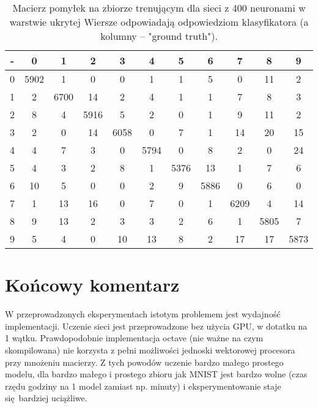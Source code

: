 \documentclass[a4paper]{article}
\begin{document}
\begin{table}[!hbt]
    \caption{Macierz pomyłek na zbiorze trenującym dla sieci z 400 neuronami w warstwie ukrytej
    Wiersze odpowiadają odpowiedziom klasyfikatora (a kolumny -- "ground truth").
    \label{table:confusion3}
    }
\footnotesize
\begin{center}
    \begin{tabular}{ 
        |@{\hskip3pt}c@{\hskip3pt}
        |@{\hskip3pt}c@{\hskip3pt}
        |@{\hskip3pt}c@{\hskip3pt}
        |@{\hskip3pt}c@{\hskip3pt}
        |@{\hskip3pt}c@{\hskip3pt}
        |@{\hskip3pt}c@{\hskip3pt}
        |@{\hskip3pt}c@{\hskip3pt}
        |@{\hskip3pt}c@{\hskip3pt}
        |@{\hskip3pt}c@{\hskip3pt}
        |@{\hskip3pt}c@{\hskip3pt}
        |@{\hskip3pt}c@{\hskip3pt}|
        }
    \hline
- &         0&     1&     2&     3&     4&     5&     6&     7&     8&    9 \\
    \hline
0   &5902&     1&     0&     0&     1&     1&     5&     0&    11&     2 \\
1   &   2&  6700&    14&     2&     4&     1&     1&     7&     8&     3 \\
2   &   8&     4&  5916&     5&     2&     0&     1&     9&    11&     2 \\
3   &   2&     0&    14&  6058&     0&     7&     1&    14&    20&    15 \\
4   &   4&     7&     3&     0&  5794&     0&     8&     2&     0&    24 \\
5   &   4&     3&     2&     8&     1&  5376&    13&     1&     7&     6 \\
6   &  10&     5&     0&     0&     2&     9&  5886&     0&     6&     0 \\
7   &   1&    13&    16&     0&     7&     0&     1&  6209&     4&    14 \\
8   &   9&    13&     2&     3&     3&     2&     6&     1&  5805&     7 \\
9  &   5&     4&     0&    10&    13&     8&     2&    17&    17&  5873 \\
    \hline
    \end{tabular}
\end{center}
\end{table}


\section{Końcowy komentarz}

W przeprowadzonych eksperymentach istotym problemem jest wydajność implementacji.
Uczenie sieci jest przeprowadzone bez użycia GPU, w dotatku na 1 wątku. 
Prawdopodobnie implementacja octave (nie ważne na czym skompilowana)
nie korzysta z pełni możliwości jednoski wektorowej procesora przy mnożeniu macierzy.
Z tych powodów uczenie bardzo małego prostego modelu,
dla bardzo małego i prostego zbioru jak MNIST jest bardzo wolne
(czas rzędu godziny na 1 model zamiast np. minuty)
i eksperymentowanie staje się bardziej uciążliwe.
\end{document}
